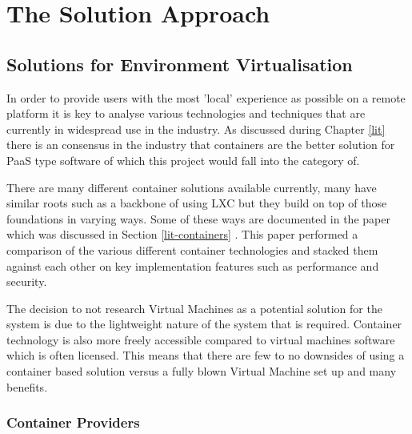 \chapter{The Solution Approach} \label{solapp}

\section{Solutions for Environment Virtualisation} \label{subapp-virt}
In order to provide users with the most 'local' experience as possible on a remote platform it is key to analyse various technologies and techniques that are currently in widespread use in the industry. As discussed during Chapter \ref{lit} there is an consensus in the industry that containers are the better solution for PaaS type software of which this project would fall into the category of.

There are many different container solutions available currently, many have similar roots such as a backbone of using LXC but they build on top of those foundations in varying ways. Some of these ways are documented in the paper which was discussed in Section \ref{lit-containers} \cite{contsvsvirt}. This paper performed a comparison of the various different container technologies and stacked them against each other on key implementation features such as performance and security.

The decision to not research Virtual Machines as a potential solution for the system is due to the lightweight nature of the system that is required. Container technology is also more freely accessible compared to virtual machines software which is often licensed. This means that there are few to no downsides of using a container based solution versus a fully blown Virtual Machine set up and many benefits.

\subsection{Container Providers} 

